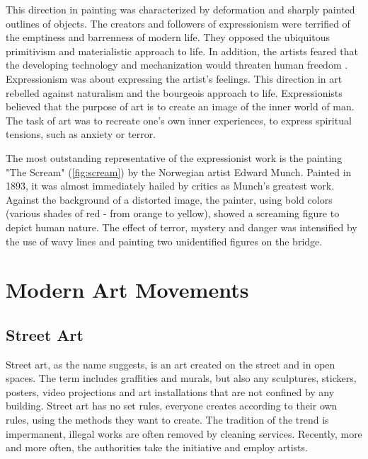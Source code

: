 \documentclass{report}
\begin{document}
This direction in painting was characterized by deformation and sharply painted outlines of objects. The creators and followers of expressionism were terrified of the emptiness and barrenness of modern life. They opposed the ubiquitous primitivism and materialistic approach to life. In addition, the artists feared that the developing technology and mechanization would threaten human freedom \cite{BOOK:2}. Expressionism was about expressing the artist's feelings. This direction in art rebelled against naturalism and the bourgeois approach to life. Expressionists believed that the purpose of art is to create an image of the inner world of man. The task of art was to recreate one's own inner experiences, to express spiritual tensions, such as anxiety or terror.

The most outstanding representative of the expressionist work is the painting "The Scream" (\autoref{fig:scream}) by the Norwegian artist Edward Munch. Painted in 1893, it was almost immediately hailed by critics as Munch's greatest work. Against the background of a distorted image, the painter, using bold colors (various shades of red - from orange to yellow), showed a screaming figure to depict human nature. The effect of terror, mystery and danger was intensified by the use of wavy lines and painting two unidentified figures on the bridge.



\chapter{Modern Art Movements}
\label{chap.modern_art_movements}

\section{Street Art}

Street art, as the name suggests, is an art created on the street and in open spaces. The term includes graffities and murals, but also any sculptures, stickers, posters, video projections and art installations that are not confined by any building. Street art has no set rules, everyone creates according to their own rules, using the methods they want to create. The tradition of the trend is impermanent, illegal works are often removed by cleaning services. Recently, more and more often, the authorities take the initiative and employ artists.\medskip
\end{document}
